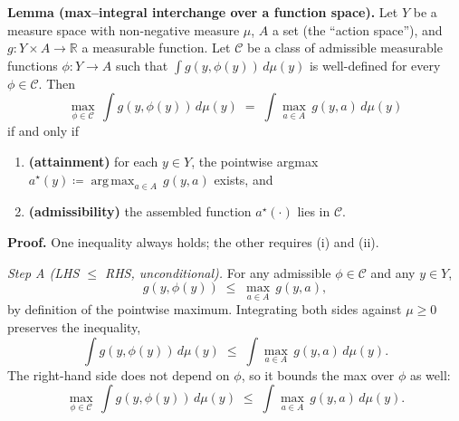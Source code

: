 \documentclass[11pt]{article}
\newcommand{\R}{\mathbb{R}}
\newcommand{\argmax}{\operatorname*{arg\,max}}
\begin{document}
\begin{framed}
\noindent\textbf{Lemma (max--integral interchange over a function space).}  Let $Y$ be a measure space with non-negative measure $\mu$, $A$ a set (the ``action space''), and $g: Y \times A \to \R$ a measurable function.  Let $\mathcal{C}$ be a class of admissible measurable functions $\phi: Y \to A$ such that $\int g(y, \phi(y))\, d\mu(y)$ is well-defined for every $\phi \in \mathcal{C}$.  Then
\begin{equation}
\max_{\phi \in \mathcal{C}}\, \int g(y, \phi(y))\, d\mu(y) \;=\; \int \max_{a \in A}\, g(y, a)\, d\mu(y)
\label{eq:interchange_lemma}
\end{equation}
if and only if
\begin{enumerate}[nosep, label=(\roman*)]
\item \textbf{(attainment)} for each $y \in Y$, the pointwise argmax $a^\star(y) \coloneqq \argmax_{a \in A}\, g(y, a)$ exists, and
\item \textbf{(admissibility)} the assembled function $a^\star(\cdot)$ lies in $\mathcal{C}$.
\end{enumerate}

\vspace{2pt}
\textbf{Proof.}  One inequality always holds; the other requires (i) and (ii).

\emph{Step A (LHS $\leq$ RHS, unconditional).}  For any admissible $\phi \in \mathcal{C}$ and any $y \in Y$,
\begin{equation*}
g(y, \phi(y)) \;\leq\; \max_{a \in A}\, g(y, a),
\end{equation*}
by definition of the pointwise maximum.  Integrating both sides against $\mu \geq 0$ preserves the inequality,
\begin{equation*}
\int g(y, \phi(y))\, d\mu(y) \;\leq\; \int \max_{a \in A}\, g(y, a)\, d\mu(y).
\end{equation*}
The right-hand side does not depend on $\phi$, so it bounds the max over $\phi$ as well:
\begin{equation*}
\max_{\phi \in \mathcal{C}}\, \int g(y, \phi(y))\, d\mu(y) \;\leq\; \int \max_{a \in A}\, g(y, a)\, d\mu(y).
\end{equation*}


\end{framed}
\end{document}
